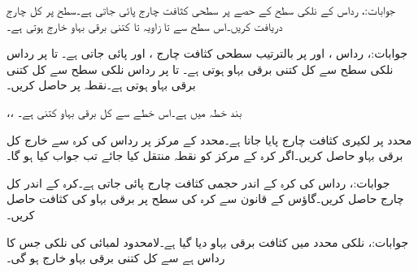 جوابات:، 
رداس  کے نلکی سطح کے  حصے  پر سطحی کثافت چارج  پائی جاتی ہے۔سطح پر کل چارج دریافت کریں۔اس سطح سے  تا  زاویہ  تا  کتنی برقی بہاو خارج ہوتی ہے۔

جوابات:، 
رداس ،  اور  پر بالترتیب سطحی کثافت چارج ،  اور  پائی جاتی ہے۔  تا   پر رداس  نلکی سطح سے کل کتنی برقی بہاو ہوتی ہے۔ تا   پر رداس  نلکی سطح سے کل کتنی برقی بہاو ہوتی ہے۔نقطہ  پر  حاصل کریں۔

،،
بند خطہ  میں  ہے۔اس خطے سے کل برقی بہاو کتنی ہے۔

محدد  پر لکیری کثافت چارج  پایا جاتا ہے۔محدد کے مرکز پر رداس  کی کرہ سے خارج کل برقی بہاو حاصل کریں۔اگر کرہ کے مرکز کو نقطہ  منتقل کیا جائے تب جواب کیا ہو گا۔

جوابات:، 
رداس  کی کرہ کے اندر حجمی کثافت چارج  پائی جاتی ہے۔کرہ کے اندر کل چارج حاصل کریں۔گاؤس کے قانون سے کرہ کی سطح پر برقی بہاو کی کثافت حاصل کریں۔

جوابات:، 
نلکی محدد میں کثافت برقی بہاو  دیا گیا ہے۔لامحدود لمبائی کی نلکی جس کا رداس  ہے سے کل کتنی برقی بہاو خارج ہو گی۔

